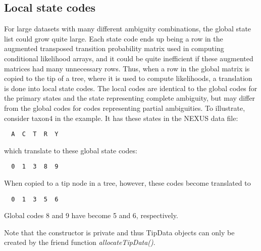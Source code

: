\subsection{Local state codes}
For large datasets with many different ambiguity combinations, the global state list could grow quite large. Each state code ends up being a row in the augmented transposed transition probability matrix used in computing conditional likelihood arrays, and it could be quite inefficient if these augmented matrices had many unnecessary rows. Thus, when a row in the global matrix is copied to the tip of a tree, where it is used to compute likelihoods, a translation is done into local state codes. The local codes are identical to the global codes for the primary states and the state representing complete ambiguity, but may differ from the global codes for codes representing partial ambiguities. To illustrate, consider taxon4 in the example. It has these states in the NEXUS data file:
\begin{verbatim}
  A	 C	T  R  Y
\end{verbatim}
which translate to these global state codes:
\begin{verbatim}
  0	 1	3  8  9
\end{verbatim}
When copied to a tip node in a tree, however, these codes become translated to
\begin{verbatim}
  0	 1	3  5  6
\end{verbatim}
Global codes 8 and 9 have become 5 and 6, respectively.

Note that the constructor is private and thus TipData objects can only be created by the friend function {\em allocateTipData()}.



	